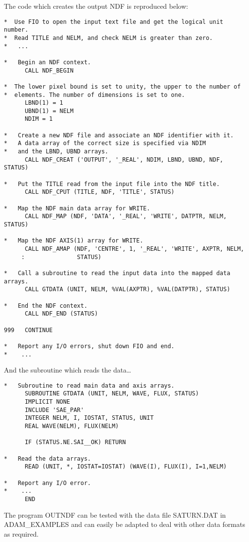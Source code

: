 The code which creates the output NDF is reproduced below:
\begin{verbatim}
*  Use FIO to open the input text file and get the logical unit number.
*  Read TITLE and NELM, and check NELM is greater than zero.
*   ...

*   Begin an NDF context.    
      CALL NDF_BEGIN                                          

*  The lower pixel bound is set to unity, the upper to the number of
*  elements. The number of dimensions is set to one.
      LBND(1) = 1
      UBND(1) = NELM
      NDIM = 1
                                                              
*   Create a new NDF file and associate an NDF identifier with it.
*   A data array of the correct size is specified via NDIM
*   and the LBND, UBND arrays.
      CALL NDF_CREAT ('OUTPUT', '_REAL', NDIM, LBND, UBND, NDF, STATUS)

*   Put the TITLE read from the input file into the NDF title.
      CALL NDF_CPUT (TITLE, NDF, 'TITLE', STATUS)

*   Map the NDF main data array for WRITE.
      CALL NDF_MAP (NDF, 'DATA', '_REAL', 'WRITE', DATPTR, NELM, STATUS)

*   Map the NDF AXIS(1) array for WRITE.
      CALL NDF_AMAP (NDF, 'CENTRE', 1, '_REAL', 'WRITE', AXPTR, NELM, 
     :               STATUS)

*   Call a subroutine to read the input data into the mapped data arrays.
      CALL GTDATA (UNIT, NELM, %VAL(AXPTR), %VAL(DATPTR), STATUS)

*   End the NDF context.                                       
      CALL NDF_END (STATUS)                                  

999   CONTINUE

*   Report any I/O errors, shut down FIO and end.
*    ...      
\end{verbatim}
And the subroutine which reads the data\ldots
\begin{verbatim}
*   Subroutine to read main data and axis arrays.
      SUBROUTINE GTDATA (UNIT, NELM, WAVE, FLUX, STATUS)
      IMPLICIT NONE                               
      INCLUDE 'SAE_PAR' 
      INTEGER NELM, I, IOSTAT, STATUS, UNIT
      REAL WAVE(NELM), FLUX(NELM)
      
      IF (STATUS.NE.SAI__OK) RETURN

*   Read the data arrays.
      READ (UNIT, *, IOSTAT=IOSTAT) (WAVE(I), FLUX(I), I=1,NELM)

*   Report any I/O error.
*    ...
      END
\end{verbatim}
The program OUTNDF can be tested with the data file SATURN.DAT in 
ADAM\_EXAMPLES and can easily be adapted to deal with other data formats
as required.


